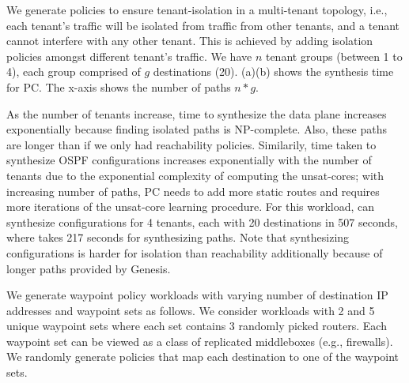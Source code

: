 We generate policies to ensure tenant-isolation
in a multi-tenant topology, i.e., each
tenant's traffic will be isolated from traffic from
other tenants, and a tenant cannot interfere with any 
other tenant. This is achieved by adding isolation policies
amongst different tenant's traffic. 
We have $n$ tenant groups (between 1 to 4), 
each group comprised of $g$ destinations (20). 
(a)(b)
shows the synthesis time 
for PC.
The x-axis shows the number of paths $n * g$. 
 
 

 As the number of tenants increase, time to 
synthesize the data plane increases exponentially 
because finding isolated paths is NP-complete. Also, these
paths are longer than if we only had reachability policies. 
Similarily, time taken to synthesize 
OSPF configurations increases exponentially with the 
number of tenants due to the exponential complexity of computing 
the unsat-cores; with increasing number of 
paths, PC needs to add more static routes 
and requires more iterations of the unsat-core learning
procedure. 
For this workload, \name can
synthesize configurations for 4 tenants, each with
20 destinations in 507 seconds, where \genesis takes 217 seconds
for synthesizing paths. Note that synthesizing 
configurations is harder for isolation than reachability 
additionally because of longer paths provided by Genesis.

We generate waypoint policy 
workloads with varying number of destination IP addresses and 
waypoint sets as follows. 
We consider workloads with 2 and 5 unique waypoint 
sets where each set contains 3 randomly picked routers.  
Each waypoint set can be 
viewed as a class of replicated middleboxes (e.g., firewalls).
We randomly generate policies that map each destination to one of the waypoint sets. 


